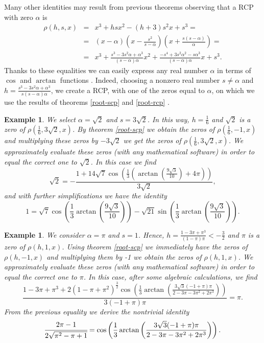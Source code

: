 \documentclass[12pt,reqno]{article}
\newtheorem{examp}[theorem]{Example}
\newenvironment{example}{\begin{examp}\normalfont\quad}{\end{examp}}
\begin{document}
Many other identities may result from previous theorems observing that a RCP with zero $\alpha$ is
\begin{eqnarray} \label{rcp-extended}
\rho(h,s,x) &=& x^3+hsx^2-(h+3)s^2x+s^3 =\nonumber \\
 &=&(x-\alpha)\left(x-\frac{s^2}{s-\alpha }\right)\left(x+\frac{s (s-\alpha )}{\alpha }\right) =\nonumber\\ 
& =& x^3+\frac{s^3-3 s^2 \alpha+\alpha^3}{(s-\alpha) \alpha}x^2+\frac{-s^4+3 s^2 \alpha^2-s \alpha^3}{(s-\alpha) \alpha}x+s^3. \end{eqnarray}
Thanks to these equalities we can easily express any real number $\alpha$ in terms of $\cos$ and $\arctan$ functions . Indeed, choosing a nonzero real number $s\not=\alpha$ and $h=\frac{s^3-3s^2\alpha+\alpha^3}{s(s-\alpha)\alpha}$, we create a RCP, with one of the zeros equal to $\alpha$, on which we use the results of 
theorems \ref{root-scp} and \ref{root-rcp} .
\begin{example}
We select $\alpha=\sqrt{2}$ and $s=3\sqrt{2}$. In this way, $h=\frac{1}{6}$ and $\sqrt{2}$ is a zero of $\rho(\frac{1}{6},3\sqrt{2},x)$. By theorem \ref{root-scp} we obtain the zeros of $\rho(\frac{1}{6},-1,x)$ and multiplying these zeros by $-3\sqrt{2}$ we get the zeros of $\rho(\frac{1}{6},3\sqrt{2},x)$. We approximately evaluate these zeros (with any mathematical software) in order to equal the correct one to $\sqrt{2}$. In this case we find
$$\sqrt{2}=-\frac{1+14\sqrt{7}\cos\left(\frac{1}{3}\left(\arctan\left(\frac{9\sqrt{3}}{10}\right)+4\pi\right)\right)}{3\sqrt{2}},$$
and with further simplifications we have the identity
$$1=\sqrt{7}\cos\left(\frac{1}{3}\arctan\left(\frac{9\sqrt{3}}{10}\right)\right)-\sqrt{21}\sin\left(\frac{1}{3}\arctan\left(\frac{9\sqrt{3}}{10}\right)\right).$$
\end{example} 
\begin{example}
We consider $\alpha=\pi$ and $s=1$. Hence, $h=\frac{1-3\pi+\pi^3}{(1-\pi)\pi}<-\frac{3}{2}$ and $\pi$ is a zero of $\rho(h,1,x)$. Using theorem \ref{root-scp} we immediately have the zeros of $\rho(h,-1,x)$ and multiplying them by -1 we obtain the  zeros of $\rho(h,1,x)$. We approximately evaluate these zeros (with any mathematical software) in order to equal the correct one to $\pi$. In this case, after some algebraic calculations, we find
$$\frac{1-3 \pi +\pi ^3+2 \left(1-\pi +\pi ^2\right)^{\frac{3}{2}} \cos\left(\frac{1}{3} \arctan\left(\frac{3 \sqrt{3} (-1+\pi ) \pi }{2-3 \pi -3 \pi ^2+2 \pi ^3}\right)\right)}{3 (-1+\pi ) \pi }=\pi.$$
 From the previous equality  we derive  the nontrivial identity
$$\cfrac{2\pi-1}{2\sqrt{\pi^2-\pi+1}}=\cos\left(\frac{1}{3} \arctan\left(\frac{3 \sqrt{3} (-1+\pi ) \pi }{2-3 \pi -3 \pi ^2+2 \pi ^3}\right)\right).$$
\end{example} 
\end{document}
